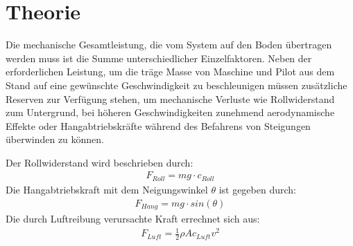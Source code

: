 \chapter{Theorie}
	Die mechanische Gesamtleistung, die vom System auf den Boden übertragen werden muss ist die Summe unterschiedlicher Einzelfaktoren.
	Neben der erforderlichen Leistung, um die träge Masse von Maschine und Pilot aus dem Stand auf eine gewünschte Geschwindigkeit zu beschleunigen müssen zusätzliche Reserven zur Verfügung stehen, um mechanische Verluste wie Rollwiderstand zum Untergrund, bei höheren Geschwindigkeiten zunehmend aerodynamische Effekte oder Hangabtriebskräfte während des Befahrens von Steigungen überwinden zu können.\par
	Der Rollwiderstand wird beschrieben durch:
	\begin{align}
		F_{Roll} = mg \cdot c_{Roll}
		\label{eq:rolling resistance}
	\end{align}
	Die Hangabtriebskraft mit dem Neigungswinkel \(\theta\) ist gegeben durch:
	\begin{align}
		F_{Hang} = mg \cdot sin\left(\theta\right)
		\label{eq:downhill force}
	\end{align}
	Die durch Luftreibung verursachte Kraft errechnet sich aus:
	\begin{align}
		F_{Luft} = \frac{1}{2}\rho A c_{Luft} v^2
		\label{eq:air drag}
	\end{align}

